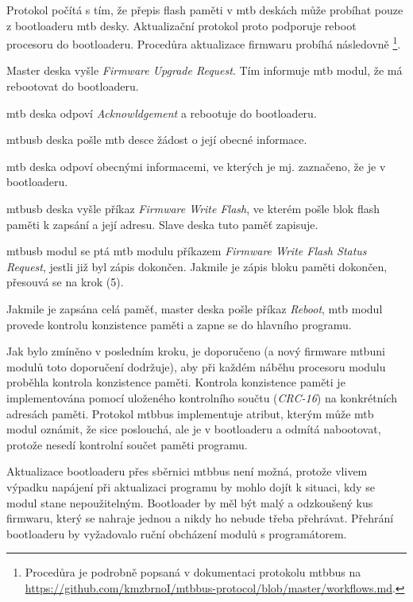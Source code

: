 Protokol počítá s tím, že přepis flash paměti v \gls{mtb} deskách může
probíhat pouze z bootloaderu \gls{mtb} desky. Aktualizační protokol proto
podporuje reboot procesoru do bootloaderu. Procedůra aktualizace firmwaru
probíhá následovně \footnote{Procedůra je podrobně popsaná v dokumentaci protokolu
\gls{mtbbus} na
\url{https://github.com/kmzbrnoI/mtbbus-protocol/blob/master/workflows.md}.}.

\begin{compactenum}
\item Master deska vyšle \textit{Firmware Upgrade Request}. Tím informuje \gls{mtb}
	modul, že má rebootovat do bootloaderu.
\item \gls{mtb} deska odpoví \textit{Acknowldgement} a rebootuje do bootloaderu.
\item \gls{mtbusb} deska pošle \gls{mtb} desce žádost o její obecné informace.
\item \gls{mtb} deska odpoví obecnými informacemi, ve kterých je mj. zaznačeno,
	že je v bootloaderu.
\item \gls{mtbusb} deska vyšle příkaz \textit{Firmware Write Flash}, ve kterém pošle
	blok flash paměti k zapsání a její adresu. Slave deska tuto paměť zapisuje.
\item \gls{mtbusb} modul se ptá \gls{mtb} modulu příkazem \textit{Firmware Write
	Flash Status Request}, jestli již byl zápis dokončen. Jakmile je zápis bloku
	paměti dokončen, přesouvá se na krok (5).
\item Jakmile je zapsána celá paměť, master deska pošle příkaz \textit{Reboot},
	\gls{mtb} modul provede kontrolu konzistence paměti a zapne se do hlavního
	programu.
\end{compactenum}

Jak bylo zmíněno v posledním kroku, je doporučeno (a nový firmware
\gls{mtbuni} modulů toto doporučení dodržuje), aby při každém náběhu
procesoru modulu proběhla kontrola konzistence paměti. Kontrola konzistence
paměti je implementována pomocí uloženého kontrolního součtu (\textit{CRC-16})
na konkrétních adresách paměti. Protokol \gls{mtbbus} implementuje atribut,
kterým může \gls{mtb} modul oznámit, že sice poslouchá, ale je v bootloaderu
a odmítá nabootovat, protože nesedí kontrolní součet paměti programu.

Aktualizace bootloaderu přes sběrnici \gls{mtbbus} není možná, protože vlivem
výpadku napájení při aktualizaci programu by mohlo dojít k situaci, kdy se modul
stane nepoužitelným. Bootloader by měl být malý a odzkoušený kus firmwaru, který
se nahraje jednou a nikdy ho nebude třeba přehrávat. Přehrání bootloaderu by
vyžadovalo ruční obcházení modulů s programátorem.
